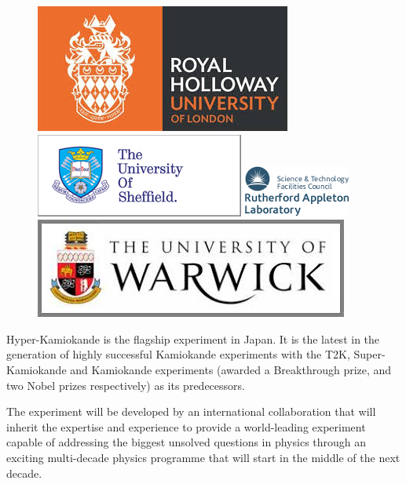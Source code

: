 \documentclass[11pt]{article}
\begin{document}
\begin{figure}[htb]
\begin{center}
\includegraphics[scale=.2]{figs/rhul.jpg}
\vspace{.2cm}
\includegraphics[scale=0.3]{figs/sheffield.png}
\hspace{.2cm}
\includegraphics[scale=0.5]{figs/RAL.png}
\vspace{.2cm}
\includegraphics[scale=.2]{figs/warwick.jpg}
\end{center}
\end{figure}
\newpage

\makeatletter
\let\toc@pre\relax
\let\toc@post\relax
\makeatother

\newpage

Hyper-Kamiokande is the flagship experiment in Japan. It is the latest
in the generation of highly successful Kamiokande experiments with the
T2K, Super-Kamiokande and Kamiokande experiments (awarded a
Breakthrough prize, and two Nobel prizes respectively) as its
predecessors.

The experiment will be developed by an international collaboration
that will inherit the expertise and experience to provide a
world-leading experiment capable of addressing the biggest unsolved
questions in physics through an exciting multi-decade physics
programme that will start in the middle of the next decade.
\end{document}
